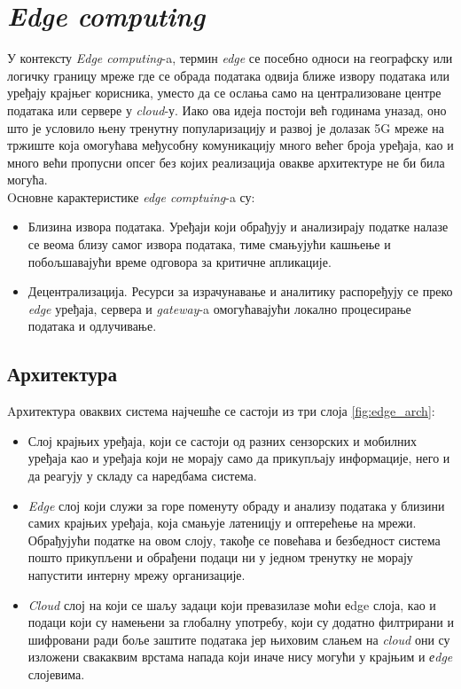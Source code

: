 
\section{\textit{Edge computing}}

У контексту \textit{Edge computing}-a, термин \textit{edge} се посебно односи на географску или логичку границу мреже где се обрада података одвија ближе извору података или уређају крајњег корисника, уместо да се ослања само на централизоване центре података или сервере у \textit{cloud}-у. Иако ова идеја постоји већ годинама уназад, оно што је условило њену тренутну популаризацију и  развој је долазак 5G мреже на тржиште која омогућава међусобну комуникацију много већег броја уређаја, као и много већи пропусни опсег без којих реализација овакве архитектуре не би била могућа.\\

Oсновне карактеристике \textit{edge comptuing}-a су:
\begin{itemize}
    \item Близина извора података. Уређаји који обрађују и анализирају податке налазе се веома близу самог извора података, тиме смањујући кашњење и побољшавајући време одговора за критичне апликације.

    \item Децентрализација. Ресурси за израчунавање и аналитику распоређују се преко \textit{edge} уређаја, сервера и \textit{gateway}-a омогућавајући локално процесирање података и одлучивање.
\end{itemize}

\subsection{Архитектура}

Aрхитектура оваквих система најчешће се састоји из три слоја \ref{fig:edge_arch}:

\begin{itemize}
    \item Слој крајњих уређаја, који се састоји од разних сензорских и мобилних уређаја као и уређаја који не морају само да прикупљају информације, него и да реагују у складу са наредбама система.

    \item \textit{Edge} слој који служи за горе поменуту обраду и анализу података у близини самих крајњих уређаја, која смањује латеницју и оптерећење на мрежи. Обрађујући податке на овом слоју, такође се повећава и безбедност система пошто прикупљени и обрађени подаци ни у једном тренутку не морају напустити интерну мрежу организације.

    \item \textit{Cloud} слој на који се шаљу задаци који превазилазе моћи {еdge} слоја, као и подаци који су намењени за глобалну употребу, који су додатно филтрирани и шифровани ради боље заштите података јер њиховим слањем на \textit{cloud} они су изложени свакаквим врстама напада који иначе нису могући у крајњим и \textit{еdge} слојевима.

\end{itemize}

